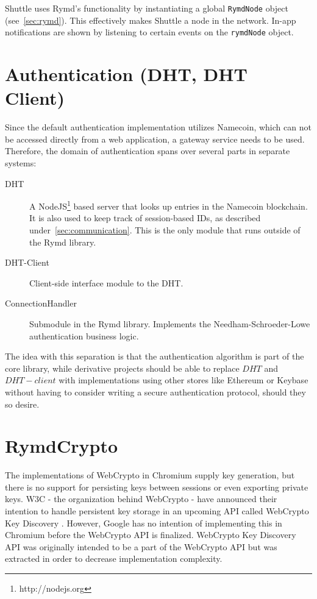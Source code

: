 Shuttle uses Rymd's functionality by instantiating a global \texttt{RymdNode} object (see~\ref{sec:rymd}). This effectively makes Shuttle a node in the network. In-app notifications are shown by listening to certain events on the \texttt{rymdNode} object.

\section{Authentication (DHT, DHT Client)}
\label{sec:authentication}
Since the default authentication implementation utilizes Namecoin, which can not be accessed directly from a web application, a gateway service needs to be used. Therefore, the domain of authentication spans over several parts in separate systems:

\begin{description}
  \item[DHT] A NodeJS\footnote{http://nodejs.org} based server that looks up entries in the Namecoin blockchain. It is also used to keep track of session-based IDs, as described under~\ref{sec:communication}. This is the only module that runs outside of the Rymd library.
  \item[DHT-Client] Client-side interface module to the DHT.
  \item[ConnectionHandler] Submodule in the Rymd library. Implements the Needham-Schroeder-Lowe authentication business logic.
\end{description}

The idea with this separation is that the authentication algorithm is part of the core library, while derivative projects should be able to replace $DHT$ and $DHT-client$ with implementations using other stores like Ethereum or Keybase without having to consider writing a secure authentication protocol, should they so desire.

\section{RymdCrypto}
\label{sec:cryptography}
The implementations of WebCrypto in Chromium supply key generation, but there is no support for persisting keys between sessions or even exporting private keys. W3C - the organization behind WebCrypto - have announced their intention to handle persistent key storage in an upcoming API called WebCrypto Key Discovery \cite{WebCryptoKeyDiscovery:Online}. However, Google has no intention of implementing this in Chromium before the WebCrypto API is finalized. WebCrypto Key Discovery API was originally intended to be a part of the WebCrypto API but was extracted in order to decrease implementation complexity.


